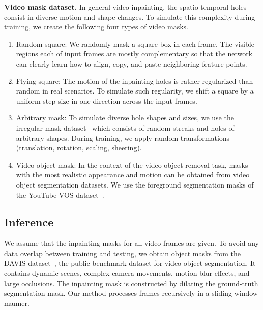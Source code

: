 \documentclass[10pt,twocolumn,letterpaper]{article}
\renewcommand{\paragraph}[1]{\vspace{1mm}\noindent\textbf{#1}}
\begin{document}
\paragraph{Video mask dataset.} 
In general video inpainting, the spatio-temporal holes consist in diverse motion and shape changes. To simulate this complexity during training, we create the following four types of video masks.

\begin{enumerate}[topsep=1pt,itemsep=1pt]
\item {Random square}: 
We randomly mask a square box in each frame. The visible regions each of input frames are mostly complementary so that the network can clearly learn how to align, copy, and paste neighboring feature points.
\item {Flying square}: 
The motion of the inpainting holes is rather regularized than random in real scenarios. To simulate such regularity, we shift a square by a uniform step size in one direction across the input frames. 
\item {Arbitrary mask}: To simulate diverse hole shapes and sizes, we use the irregular mask dataset~\cite{liu2018image} which consists of random streaks and holes of arbitrary shapes. During training, we apply random transformations (translation, rotation, scaling, sheering).
\item {Video object mask}: In the context of the video object removal task, masks with the most realistic appearance and motion can be obtained from video object segmentation datasets. We use the foreground segmentation masks of the YouTube-VOS dataset~\cite{xu2018youtube}.  
\end{enumerate}

\subsection{Inference}
We assume that the inpainting masks for all video frames are given. To avoid any data overlap between training and testing, we obtain object masks from the DAVIS dataset~\cite{perazzi2016benchmark, pont20172017}, the public benchmark dataset for video object segmentation. It contains dynamic scenes, complex camera movements, motion blur effects, and large occlusions. The inpainting mask is constructed by dilating the ground-truth segmentation mask. Our method processes frames recursively in a sliding window manner. 
\end{document}
